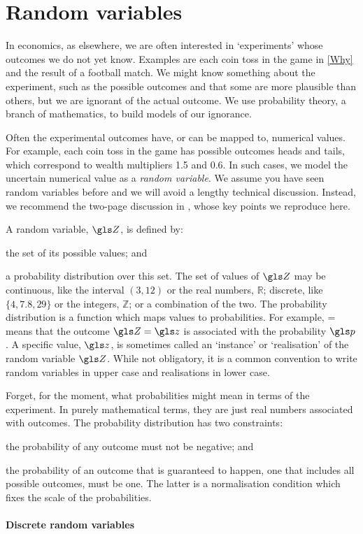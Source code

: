 \section{Random variables}
In economics, as elsewhere, we are often interested in `experiments' whose outcomes we do not yet know. Examples are each coin toss in the game in \cref{Why} and the result of a football match. We might know something about the experiment, such as the possible outcomes and that some are more plausible than others, but we are ignorant of the actual outcome. We use probability theory, a branch of mathematics, to build models of our ignorance.

Often the experimental outcomes have, or can be mapped to, numerical values. For example, each coin toss in the game has possible outcomes heads and tails, which correspond to wealth multipliers 1.5 and 0.6. In such cases, we model the uncertain numerical value as a \textit{random variable}. We assume you have seen random variables before and we will avoid a lengthy technical discussion. Instead, we recommend the two-page discussion in \cite[p.~2]{vanKampen1992}, whose key points we reproduce here.

A random variable, $\Z$, is defined by:
\bi
\item the set of its possible values; and
\item a probability distribution over this set.
\ei
The set of values of $\Z$ may be continuous, like the interval $(3,12)$ or the real numbers, $\mathbb{R}$; discrete, like $\{4, 7.8, 29\}$ or the integers, $\mathbb{Z}$; or a combination of the two. The probability distribution is a function which maps values to probabilities. For example,
\be
{}\left[\Z=\z\right]=\p
\ee
means that the outcome $\Z=\z$ is associated with the probability $\p$. A specific value, $\z$, is sometimes called an `instance' or `realisation' of the random variable $\Z$. While not obligatory, it is a common convention to write random variables in upper case and realisations in lower case.

Forget, for the moment, what probabilities might mean in terms of the experiment. In purely mathematical terms, they are just real numbers associated with outcomes. The probability distribution has two constraints:
\bi
\item the probability of any outcome must not be negative; and
\item the probability of an outcome that is guaranteed to happen, \ie one that includes all possible outcomes, must be one.
\ei
The latter is a normalisation condition which fixes the scale of the probabilities.
\\
\mbox{}\\
\textbf{Discrete random variables}

